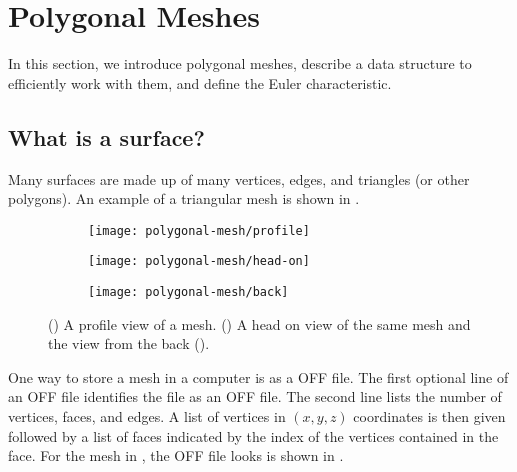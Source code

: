 \section{Polygonal Meshes}
\label{sec:polygonal}

In this section, we introduce polygonal meshes, describe a data structure to efficiently
work with them, and define the Euler characteristic.

\subsection{What is a surface?}

 Many surfaces are made up of many vertices, edges, and
triangles (or other polygons). An example of a triangular mesh is shown in .


 \begin{figure}[htb]
         \centering
        \begin{subfigure}[b]{0.3\textwidth}
         \texttt{[image: polygonal-mesh/profile]}
         \caption{}
 	 \label{fig:profile}
       \end{subfigure}
         \hspace{.6cm}
         \begin{subfigure}[b]{0.19\textwidth}
         \texttt{[image: polygonal-mesh/head-on]}
         \caption{}
          \label{fig:head-on}
         \end{subfigure}
             \hspace{.6cm}
         \begin{subfigure}[b]{0.24\textwidth}
         \texttt{[image: polygonal-mesh/back]}
         \caption{}
          \label{fig:back}
         \end{subfigure}
		\caption{() A profile view of a mesh.
 		()  A head on view of the same mesh and the view from the back ().
 		\label{fig:cat}}
 \end{figure}

One way to store a mesh in a computer is as a OFF file.
The first optional line of an OFF file identifies the file as an OFF file.
The second line lists the number of vertices, faces, and edges.
A list of vertices in $(x,y,z)$ coordinates is then given followed
by a list of faces indicated by the index of the vertices contained in the face.
For the mesh in , the OFF file looks is shown in 
.


